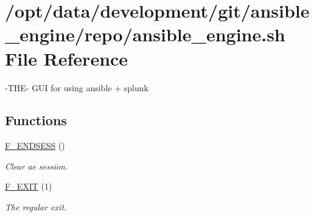 \hypertarget{ansible__engine_8sh}{}\section{/opt/data/development/git/ansible\+\_\+engine/repo/ansible\+\_\+engine.sh File Reference}
\label{ansible__engine_8sh}


-\/\+T\+H\+E-\/ G\+UI for using ansible + splunk  


\subsection*{Functions}
\begin{DoxyCompactItemize}
\item 
\mbox{\hyperlink{ansible__engine_8sh_ae32aed87711d2842d25199eda0b2726e}{F\+\_\+\+E\+N\+D\+S\+E\+SS}} ()
\begin{DoxyCompactList}\small\item\em Clear ae session. \end{DoxyCompactList}\item 
\mbox{\hyperlink{ansible__engine_8sh_a66ec6201aeab8fa5ad0064b93bd4850c}{F\+\_\+\+E\+X\+IT}} (1)
\begin{DoxyCompactList}\small\item\em The regular exit. \end{DoxyCompactList}\end{DoxyCompactItemize}
